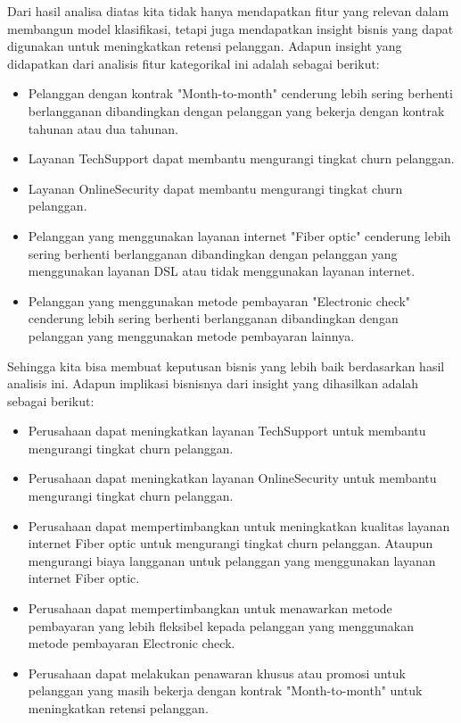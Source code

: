 Dari hasil analisa diatas kita tidak hanya mendapatkan fitur yang relevan dalam membangun model klasifikasi, tetapi juga mendapatkan insight bisnis yang dapat digunakan untuk meningkatkan retensi pelanggan. Adapun insight yang didapatkan dari analisis fitur kategorikal ini adalah sebagai berikut:

\begin{itemize}
    \item Pelanggan dengan kontrak "Month-to-month" cenderung lebih sering berhenti berlangganan dibandingkan dengan pelanggan yang bekerja dengan kontrak tahunan atau dua tahunan.
    \item Layanan TechSupport dapat membantu mengurangi tingkat churn pelanggan.
    \item Layanan OnlineSecurity dapat membantu mengurangi tingkat churn pelanggan.
    \item Pelanggan yang menggunakan layanan internet "Fiber optic" cenderung lebih sering berhenti berlangganan dibandingkan dengan pelanggan yang menggunakan layanan DSL atau tidak menggunakan layanan internet.
    \item Pelanggan yang menggunakan metode pembayaran "Electronic check" cenderung lebih sering berhenti berlangganan dibandingkan dengan pelanggan yang menggunakan metode pembayaran lainnya.
\end{itemize}

Sehingga kita bisa membuat keputusan bisnis yang lebih baik berdasarkan hasil analisis ini. Adapun implikasi bisnisnya dari insight yang dihasilkan adalah sebagai berikut:

\begin{itemize}
    \item Perusahaan dapat meningkatkan layanan TechSupport untuk membantu mengurangi tingkat churn pelanggan.
    \item Perusahaan dapat meningkatkan layanan OnlineSecurity untuk membantu mengurangi tingkat churn pelanggan.
    \item Perusahaan dapat mempertimbangkan untuk meningkatkan kualitas layanan internet Fiber optic untuk mengurangi tingkat churn pelanggan. Ataupun mengurangi biaya langganan untuk pelanggan yang menggunakan layanan internet Fiber optic.
    \item Perusahaan dapat mempertimbangkan untuk menawarkan metode pembayaran yang lebih fleksibel kepada pelanggan yang menggunakan metode pembayaran Electronic check.
    \item Perusahaan dapat melakukan penawaran khusus atau promosi untuk pelanggan yang masih bekerja dengan kontrak "Month-to-month" untuk meningkatkan retensi pelanggan.
\end{itemize}

